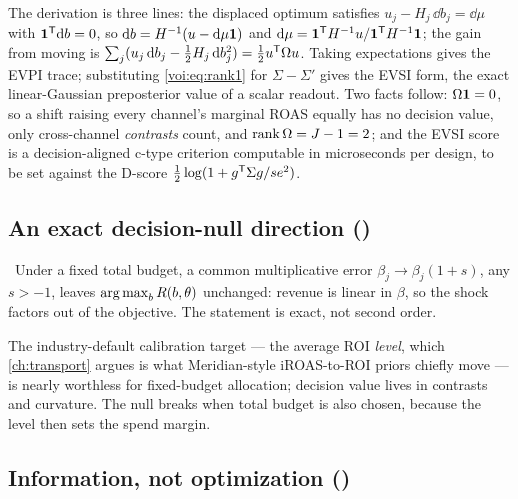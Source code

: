 The derivation is three lines: the displaced optimum satisfies $u_j - H_j\,\dd b_j = \dd\mu$ with $\mathbf{1}^{\mathsf{T}}\mathrm{d} b = 0$, so $\mathrm{d} b = H^{-1}(u - \mathrm{d}\mu\mathbf{1})$ and $\mathrm{d}\mu = \mathbf{1}^{\mathsf{T}} H^{-1}u/\mathbf{1}^{\mathsf{T}} H^{-1}\mathbf{1}$; the gain from moving is $\sum_j(u_j\,\mathrm{d} b_j - \tfrac12 H_j\,\mathrm{d} b_j^2) = \tfrac12 u^{\mathsf{T}}\Omega u$. Taking expectations gives the EVPI trace; substituting \cref{voi:eq:rank1} for $\Sigma - \Sigma'$ gives the EVSI form, the exact linear-Gaussian preposterior value of a scalar readout. Two facts follow: $\Omega\mathbf{1} = 0$, so a shift raising every channel's marginal ROAS equally has no decision value, only cross-channel \emph{contrasts} count, and $\operatorname{rank}\Omega = J - 1 = 2$; and the EVSI score is a decision-aligned c-type criterion computable in microseconds per design, to be set against the D-score $\tfrac12\log(1 + g^{\mathsf{T}}\Sigma g/se^2)$.

\subsection{An exact decision-null direction ()}

\begin{proposition}
\label{voi:prop:null}
\tagEstablished\ Under a fixed total budget, a common multiplicative error $\beta_j \to \beta_j(1+s)$, any $s > -1$, leaves $\operatorname*{arg\,max}_b R(b,\theta)$ unchanged: revenue is linear in $\beta$, so the shock factors out of the objective. The statement is exact, not second order.
\end{proposition}

\begin{corollary}
\label{voi:cor:null}
The industry-default calibration target --- the average ROI \emph{level}, which \cref{ch:transport} argues is what Meridian-style iROAS-to-ROI priors chiefly move --- is nearly worthless for fixed-budget allocation; decision value lives in contrasts and curvature. The null breaks when total budget is also chosen, because the level then sets the spend margin.
\end{corollary}

\subsection{Information, not optimization ()}

